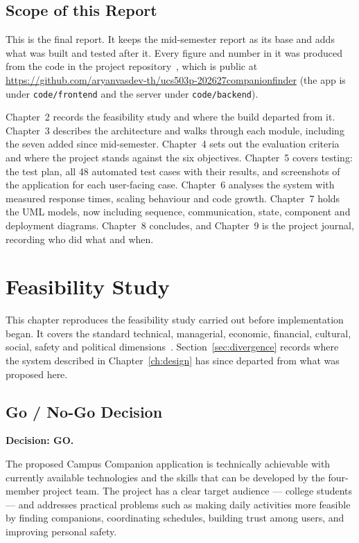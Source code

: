 \documentclass{tietreport}
\begin{document}
\section{Scope of this Report}

This is the final report. It keeps the mid-semester report as its base and adds what
was built and tested after it. Every figure and number in it was produced from the code
in the project repository~\cite{campuscompanion2026}, which is public at
\url{https://github.com/aryanvasdev-th/ucs503p-202627companionfinder} (the app is
under \texttt{code/frontend} and the server under \texttt{code/backend}).

Chapter~2 records the feasibility study and where the build departed from it.
Chapter~3 describes the architecture and walks through each module, including the
seven added since mid-semester. Chapter~4 sets out the evaluation criteria and where the
project stands against the six objectives. Chapter~5 covers testing: the test plan,
all 48 automated test cases with their results, and screenshots of the application
for each user-facing case. Chapter~6 analyses the system with measured response times,
scaling behaviour and code growth. Chapter~7 holds the UML models, now including
sequence, communication, state, component and deployment diagrams. Chapter~8 concludes,
and Chapter~9 is the project journal, recording who did what and when.



\chapter{Feasibility Study}

This chapter reproduces the feasibility study carried out before implementation
began. It covers the standard technical, managerial, economic, financial, cultural,
social, safety and political dimensions~\cite{sommerville2016,pressman2020}.
Section~\ref{sec:divergence} records where the system described in Chapter~\ref{ch:design}
has since departed from what was proposed here.

\section{Go / No-Go Decision}

\noindent\textbf{Decision: GO.}

The proposed Campus Companion application is technically achievable with currently
available technologies and the skills that can be developed by the four-member project
team. The project has a clear target audience --- college students --- and addresses
practical problems such as making daily activities more feasible by finding companions,
coordinating schedules, building trust among users, and improving personal safety.
\end{document}
